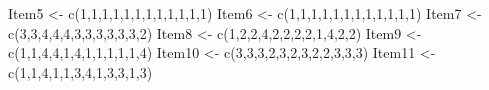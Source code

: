 \documentclass[
  english,
]{book}
\newenvironment{Shaded}{\begin{snugshade}}{\end{snugshade}}
\newcommand{\DecValTok}[1]{\textcolor[rgb]{0.00,0.00,0.81}{#1}}
\newcommand{\FunctionTok}[1]{\textcolor[rgb]{0.00,0.00,0.00}{#1}}
\newcommand{\NormalTok}[1]{#1}
\newcommand{\OtherTok}[1]{\textcolor[rgb]{0.56,0.35,0.01}{#1}}
\begin{document}
\begin{Shaded}
\begin{Highlighting}[]
\NormalTok{Item5 }\OtherTok{\textless{}{-}} \FunctionTok{c}\NormalTok{(}\DecValTok{1}\NormalTok{,}\DecValTok{1}\NormalTok{,}\DecValTok{1}\NormalTok{,}\DecValTok{1}\NormalTok{,}\DecValTok{1}\NormalTok{,}\DecValTok{1}\NormalTok{,}\DecValTok{1}\NormalTok{,}\DecValTok{1}\NormalTok{,}\DecValTok{1}\NormalTok{,}\DecValTok{1}\NormalTok{,}\DecValTok{1}\NormalTok{,}\DecValTok{1}\NormalTok{)}
\NormalTok{Item6 }\OtherTok{\textless{}{-}} \FunctionTok{c}\NormalTok{(}\DecValTok{1}\NormalTok{,}\DecValTok{1}\NormalTok{,}\DecValTok{1}\NormalTok{,}\DecValTok{1}\NormalTok{,}\DecValTok{1}\NormalTok{,}\DecValTok{1}\NormalTok{,}\DecValTok{1}\NormalTok{,}\DecValTok{1}\NormalTok{,}\DecValTok{1}\NormalTok{,}\DecValTok{1}\NormalTok{,}\DecValTok{1}\NormalTok{,}\DecValTok{1}\NormalTok{)}
\NormalTok{Item7 }\OtherTok{\textless{}{-}} \FunctionTok{c}\NormalTok{(}\DecValTok{3}\NormalTok{,}\DecValTok{3}\NormalTok{,}\DecValTok{4}\NormalTok{,}\DecValTok{4}\NormalTok{,}\DecValTok{4}\NormalTok{,}\DecValTok{3}\NormalTok{,}\DecValTok{3}\NormalTok{,}\DecValTok{3}\NormalTok{,}\DecValTok{3}\NormalTok{,}\DecValTok{3}\NormalTok{,}\DecValTok{3}\NormalTok{,}\DecValTok{2}\NormalTok{)}
\NormalTok{Item8 }\OtherTok{\textless{}{-}} \FunctionTok{c}\NormalTok{(}\DecValTok{1}\NormalTok{,}\DecValTok{2}\NormalTok{,}\DecValTok{2}\NormalTok{,}\DecValTok{4}\NormalTok{,}\DecValTok{2}\NormalTok{,}\DecValTok{2}\NormalTok{,}\DecValTok{2}\NormalTok{,}\DecValTok{2}\NormalTok{,}\DecValTok{1}\NormalTok{,}\DecValTok{4}\NormalTok{,}\DecValTok{2}\NormalTok{,}\DecValTok{2}\NormalTok{)}
\NormalTok{Item9 }\OtherTok{\textless{}{-}} \FunctionTok{c}\NormalTok{(}\DecValTok{1}\NormalTok{,}\DecValTok{1}\NormalTok{,}\DecValTok{4}\NormalTok{,}\DecValTok{4}\NormalTok{,}\DecValTok{1}\NormalTok{,}\DecValTok{4}\NormalTok{,}\DecValTok{1}\NormalTok{,}\DecValTok{1}\NormalTok{,}\DecValTok{1}\NormalTok{,}\DecValTok{1}\NormalTok{,}\DecValTok{1}\NormalTok{,}\DecValTok{4}\NormalTok{)}
\NormalTok{Item10 }\OtherTok{\textless{}{-}} \FunctionTok{c}\NormalTok{(}\DecValTok{3}\NormalTok{,}\DecValTok{3}\NormalTok{,}\DecValTok{3}\NormalTok{,}\DecValTok{2}\NormalTok{,}\DecValTok{3}\NormalTok{,}\DecValTok{2}\NormalTok{,}\DecValTok{3}\NormalTok{,}\DecValTok{2}\NormalTok{,}\DecValTok{2}\NormalTok{,}\DecValTok{3}\NormalTok{,}\DecValTok{3}\NormalTok{,}\DecValTok{3}\NormalTok{)}
\NormalTok{Item11 }\OtherTok{\textless{}{-}} \FunctionTok{c}\NormalTok{(}\DecValTok{1}\NormalTok{,}\DecValTok{1}\NormalTok{,}\DecValTok{4}\NormalTok{,}\DecValTok{1}\NormalTok{,}\DecValTok{1}\NormalTok{,}\DecValTok{3}\NormalTok{,}\DecValTok{4}\NormalTok{,}\DecValTok{1}\NormalTok{,}\DecValTok{3}\NormalTok{,}\DecValTok{3}\NormalTok{,}\DecValTok{1}\NormalTok{,}\DecValTok{3}\NormalTok{)}

\end{Highlighting}
\end{Shaded}
\end{document}
